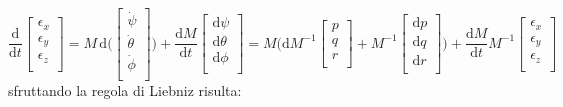 \documentclass[11pt]{report}
\theoremstyle{plain}
\theoremstyle{definition}
\theoremstyle{remark}
\begin{document}
\begin{displaymath}
\dfrac{\textrm{d}}{\textrm{d}t}
\left[ \begin{array}{c} \epsilon _{x} \\ \epsilon _{y} \\ \epsilon _{z} \\ \end{array} \right] 
= M \,
\textrm{d}\Bigr( 
\left[ \begin{array}{c} \dot{\psi} \\ \dot{\theta} \\ \dot{\phi} \\ \end{array} \right] \Bigr)
 + \dfrac{\textrm{d} M}{\textrm{d}t} 
\left[ \begin{array}{c} \textrm{d} \psi \\ \textrm{d} \theta \\ \textrm{d} \phi \\ \end{array} \right] 
= M \Bigr(
\textrm{d}M^{-1} \left[ \begin{array}{c} p \\ q \\ r \\ \end{array} \right] +
M^{-1} \left[ \begin{array}{c} \textrm{d}p \\ \textrm{d}q \\ \textrm{d}r \\ \end{array} \right] \Bigr) + 
\dfrac{\textrm{d}M}{\textrm{d}t} M^{-1} \left[ \begin{array}{c} \epsilon _{x} \\ \epsilon _{y} \\ \epsilon _{z} \\ \end{array} \right] 
\end{displaymath}
sfruttando la regola di Liebniz risulta:
\end{document}

